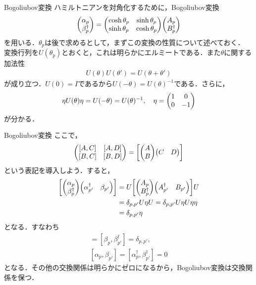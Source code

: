 \documentclass[\main/TL_liquid.tex]{subfiles}
\begin{document}
\begin{frame}{Bogoliubov変換}
    ハミルトニアンを対角化するために，Bogoliubov変換
    \begin{align}
        \mqty(\alpha_p\\ \beta_p^\dagger) =
        \mqty(
            \cosh \theta_p & \sinh \theta_p \\
            \sinh\theta_p & \cosh \theta_p
        )
        \mqty(A_p\\B_{p}^\dagger)
        \label{Bogoliubov transformation}
    \end{align}
    を用いる．$\theta_p$は後で求めるとして，まずこの変換の性質について述べておく．
    変換行列を$U(\theta_p)$とおくと，これは明らかにエルミートである．また$\theta$に関する加法性
    \begin{align}
        U(\theta)U(\theta') = U(\theta + \theta')
    \end{align}
    が成り立つ．$U(0) = I$であるから$U(-\theta) = U(\theta)^{-1}$である．さらに，
    \begin{align}
        \eta U(\theta) \eta = U(-\theta) = U(\theta)^{-1}, \quad \eta = \mqty(1&0\\0&-1)
    \end{align}
    が分かる．
\end{frame}

\begin{frame}{Bogoliubov変換}
    ここで，
    \begin{align}
        \mqty(
            [A,C] & [A,D] \\ 
            [B,C] & [B,D]
            )
        = \qty[\mqty(A\\B)\mqty(C&D)]
    \end{align}
    という表記を導入しよう．すると，
    \begin{align}
        \qty[\mqty(\alpha_p\\ \beta_p^\dagger)\mqty(\alpha_{p'}^\dagger & \beta_{p'})]
        &\nonumber
        =
        U\qty[\mqty(A_p\\ B_p^\dagger)\mqty(A_{p'}^\dagger & B_{p'})]U
        \\ &\nonumber
        = \delta_{p,p'}U \eta U
        = \delta_{p,p'} U\eta U \eta \eta
        \\ &
        = \delta_{p,p'}\eta
    \end{align}
    となる．すなわち
    \begin{gather}
        [\alpha_{p}, \alpha_{p'}^\dagger] = [\beta_{p}, 
        \beta_{p'}^\dagger] = \delta_{p,p'},
        \\
        [\alpha_{p},\beta_{p'}] = [\alpha_{p}^\dagger, \beta_{p'}^\dagger] = 0
    \end{gather}
    となる．その他の交換関係は明らかにゼロになるから，\alert{Bogoliubov変換は交換関係を保つ}．
\end{frame}
\end{document}
